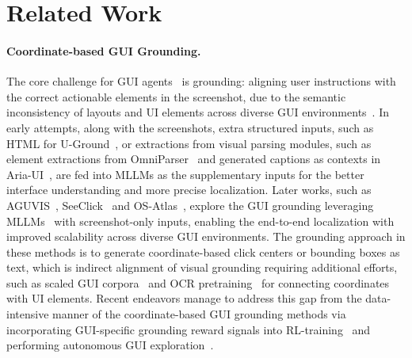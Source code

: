 \section{Related Work}
\paragraph{Coordinate-based GUI Grounding.} The core challenge for GUI agents~\citep{wang2024gui} is grounding: aligning user instructions with the correct actionable elements in the screenshot, due to the semantic inconsistency of layouts and UI elements across diverse GUI environments~\citep{liu2025infiguig1advancingguigrounding}. In early attempts, along with the screenshots, extra structured inputs, such as HTML for U-Ground~\citep{gou2024navigating}, or extractions from visual parsing modules, such as element extractions from OmniParser~\citep{Wan_2024_CVPR,yu2025omniparserv2structuredpointsofthoughtunified} and generated captions as contexts in Aria-UI~\citep{yang2024aria}, are fed into MLLMs as the supplementary inputs for the better interface understanding and more precise localization. Later works, such as AGUVIS~\citep{xu2024aguvis}, SeeClick~\citep{cheng2024seeclick} and OS-Atlas~\citep{wu2024atlas}, explore the GUI grounding leveraging MLLMs~\citep{bai2025qwen2,chen2024expanding} with screenshot-only inputs, enabling the end-to-end localization with improved scalability across diverse GUI environments. The grounding approach in these methods is to generate coordinate-based click centers or bounding boxes as text, which is indirect alignment of visual grounding requiring additional efforts, such as  scaled GUI corpora~\citep{qin2025ui,chai2024amex} and OCR pretraining~\citep{hong2024cogagent} for connecting coordinates with UI elements. Recent endeavors manage to address this gap from the data-intensive manner of the coordinate-based GUI grounding methods via incorporating GUI-specific grounding reward signals into RL-training~\citep{luo2025gui,lu2025ui,liu2025infiguig1advancingguigrounding,tang2025gui} and performing autonomous GUI exploration~\citep{fan2025gui,wu2025gui}. 

